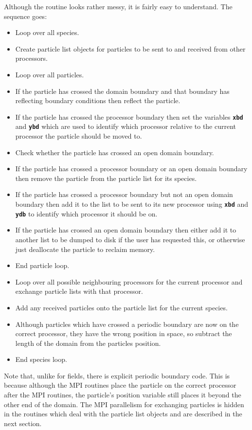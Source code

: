 \documentclass[12pt,a4paper]{article}
\newcommand{\inlinecode}[1]{{\color{warwickred} \bf\texttt{#1}}}
\begin{document}
Although the routine looks rather messy, it is fairly easy to understand. The
sequence goes:
\begin{itemize}
\item Loop over all species.
\item Create particle list objects for particles to be sent to and received from
  other processors.
\item Loop over all particles.
\item If the particle has crossed the domain boundary and that boundary has
  reflecting boundary conditions then reflect the particle.
\item If the particle has crossed the processor boundary then set the variables
  \inlinecode{xbd} and \inlinecode{ybd} which are used to identify which
  processor relative to the current processor the particle should be moved to.
\item Check whether the particle has crossed an open domain boundary.
\item If the particle has crossed a processor boundary or an open domain
  boundary then remove the particle from the particle list for its species.
\item If the particle has crossed a processor boundary but not an open domain
  boundary then add it to the list to be sent to its new processor using
  \inlinecode{xbd} and \inlinecode{ydb} to identify which processor it should
  be on.
\item If the particle has crossed an open domain boundary then either add it to
  another list to be dumped to disk if the user has requested this, or
  otherwise just deallocate the particle to reclaim memory.
\item End particle loop.
\item Loop over all possible neighbouring processors for the current processor
  and exchange particle lists with that processor.
\item Add any received particles onto the particle list for the current
  species.
\item Although particles which have crossed a periodic boundary are now on the
  correct processor, they have the wrong position in space, so subtract the
  length of the domain from the particles position.
\item End species loop.
\end{itemize}

Note that, unlike for fields, there is explicit periodic boundary code. This is
because although the MPI routines place the particle on the correct processor
after the MPI routines, the particle's position variable still places it beyond
the other end of the domain. The MPI parallelism for exchanging particles is
hidden in the routines which deal with the particle list objects and are
described in the next section.
\pagebreak
\end{document}

